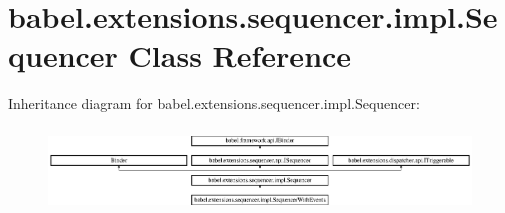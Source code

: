 \hypertarget{classbabel_1_1extensions_1_1sequencer_1_1impl_1_1_sequencer}{\section{babel.\-extensions.\-sequencer.\-impl.\-Sequencer Class Reference}
\label{classbabel_1_1extensions_1_1sequencer_1_1impl_1_1_sequencer}
}
Inheritance diagram for babel.\-extensions.\-sequencer.\-impl.\-Sequencer\-:\begin{figure}[H]
\begin{center}
\leavevmode
\includegraphics[height=2.262626cm]{classbabel_1_1extensions_1_1sequencer_1_1impl_1_1_sequencer}
\end{center}
\end{figure}
